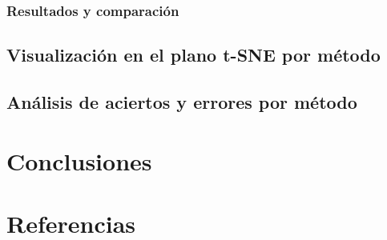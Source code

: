 \documentclass{article}
\begin{document}
\subsubsection{Resultados y comparación}

\subsection{Visualización en el plano t-SNE por método}

\subsection{Análisis de aciertos y errores por método}


\section{Conclusiones}


\section{Referencias}


\end{document}
